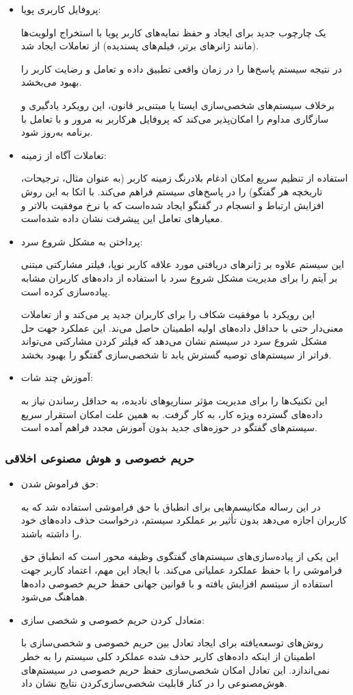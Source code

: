 \begin{itemize}
\item
 پروفایل کاربری پویا:

 یک چارچوب جدید برای ایجاد و حفظ نمایه‌های کاربر پویا با استخراج اولویت‌ها (مانند ژانرهای برتر، فیلم‌های پسندیده) از تعاملات ایجاد شد.

در نتیجه سیستم پاسخ‌ها را در زمان واقعی تطبیق داده و تعامل و رضایت کاربر را بهبود می‌بخشد.

برخلاف سیستم‌های شخصی‌سازی ایستا یا مبتنی‌بر قانون، این رویکرد یادگیری و سازگاری مداوم را امکان‌پذیر می‌کند که پروفایل هرکاربر به مرور و با تعامل با برنامه به‌روز شود.
\item
 تعاملات آگاه از زمینه:

استفاده از تنظیم سریع امکان ادغام بلادرنگ زمینه کاربر (به عنوان مثال، ترجیحات، تاریخچه هر گفتگو) را در پاسخ‌های سیستم فراهم می‌کند. با اتکا به این روش افزایش ارتباط و انسجام در گفتگو ایجاد شده‌است که با نرخ موفقیت بالاتر و معیارهای تعامل این پیشرفت نشان داده شده‌است.
\item
پرداختن به مشکل شروع سرد:

این سیستم علاوه بر ژانرهای دریافتی مورد علاقه کاربر نوپا، فیلتر مشارکتی مبتنی بر آیتم را برای مدیریت مشکل شروع سرد با استفاده از داده‌های کاربران مشابه پیاده‌سازی کرده است.

این رویکرد با موفقیت شکاف را برای کاربران جدید پر می‌کند و از تعاملات معنی‌دار حتی با حداقل داده‌های اولیه اطمینان حاصل می‌ند. این عملکرد جهت حل مشکل شروع سرد در سیستم نشان می‌دهد که فیلتر کردن مشارکتی می‌تواند فراتر از سیستم‌های توصیه گسترش یابد تا شخصی‌سازی گفتگو را بهبود بخشد.
\item
 آموزش چند شات:

 این تکنیک‌ها را برای مدیریت مؤثر سناریوهای نادیده، به حداقل رساندن نیاز به داده‌های گسترده ویژه کار، به کار گرفت.
به همین علت امکان استقرار سریع سیستم های گفتگو در حوزه‌های جدید بدون آموزش مجدد فراهم آمده است.
\end{itemize}


\subsubsection{حریم خصوصی و هوش مصنوعی اخلاقی}

\begin{itemize}
\item
 حق فراموش شدن:

در این رساله مکانیسم‌هایی برای انطباق با حق فراموشی استفاده شد که به کاربران اجازه می‌دهد بدون تأثیر بر عملکرد سیستم، درخواست حذف داده‌های خود را داشته باشند.

این یکی از پیاده‌سازی‌های سیستم‌های گفتگوی وظیفه محور است که انطباق حق فراموشی را با حفظ عملکرد عملیاتی می‌کند. با ایجاد این مهم، اعتماد کاربر جهت استفاده از سیتسم افزایش یافته و با قوانین جهانی حفظ حریم خصوصی داده‌ها هماهنگ می‌شود.
\item
 متعادل کردن حریم خصوصی و شخصی سازی:

روش‌های توسعه‌یافته برای ایجاد تعادل بین حریم خصوصی و شخصی‌سازی با اطمینان از اینکه داده‌های کاربر حذف شده عملکرد کلی سیستم را به خطر نمی‌اندازد. این تعادل امکان شخصی‌سازی حفظ حریم خصوصی در سیستم‌های هوش‌مصنوعی را در کنار قابلیت شخصی‌سازی‌کردن نتایج نشان داد.
\end{itemize}

